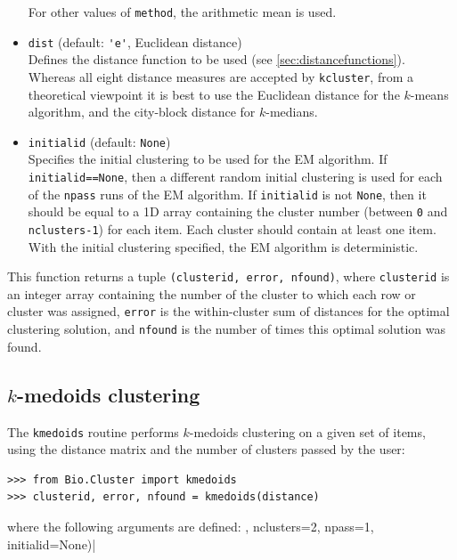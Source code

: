 \documentclass{report}
\begin{document}
\begin{itemize}
For other values of \verb|method|, the arithmetic mean is used.
\item \verb|dist| (default: \verb|'e'|, Euclidean distance) \\
Defines the distance function to be used (see \ref{sec:distancefunctions}).
Whereas all eight distance measures are accepted by \verb|kcluster|, from a theoretical viewpoint it is best to use the Euclidean distance for the $k$-means algorithm, and the city-block distance for $k$-medians.
\item \verb|initialid| (default: \verb|None|) \\
Specifies the initial clustering to be used for the EM algorithm. If \verb|initialid==None|, then a different random initial clustering is used for each of the \verb|npass| runs of the EM algorithm. If \verb|initialid| is not \verb|None|, then it should be equal to a 1D array containing the cluster number (between \verb|0| and \verb|nclusters-1|) for each item. Each cluster should contain at least one item. With the initial clustering specified, the EM algorithm is deterministic.
\end{itemize}

This function returns a tuple \verb|(clusterid, error, nfound)|, where \verb|clusterid| is an integer array containing the number of the cluster to which each row or cluster was assigned, \verb|error| is the within-cluster sum of distances for the optimal clustering solution, and \verb|nfound| is the number of times this optimal solution was found.

\subsection*{$k$-medoids clustering}

The \verb+kmedoids+ routine performs $k$-medoids clustering on a given set of items, using the distance matrix and the number of clusters passed by the user:
\begin{verbatim}
>>> from Bio.Cluster import kmedoids
>>> clusterid, error, nfound = kmedoids(distance)
\end{verbatim}
where the following arguments are defined:
, nclusters=2, npass=1, initialid=None)|
\end{document}
